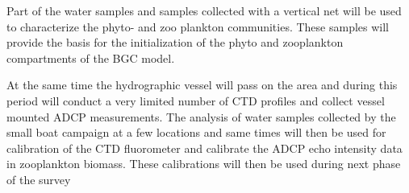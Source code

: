Part of the water samples and samples collected with a vertical net will
be used to characterize the phyto- and zoo plankton communities. These
samples will provide the basis for the initialization of the phyto and
zooplankton compartments of the BGC model.
 
At the same time the hydrographic vessel will pass on the area and
during this period will conduct a very limited number of CTD profiles
and collect vessel mounted ADCP measurements. The analysis of water
samples collected by the small boat campaign at a few locations and same
times will then be used for calibration of the CTD fluorometer and
calibrate the ADCP echo intensity data in zooplankton biomass. These
calibrations will then be used during next phase of the survey

 
 



